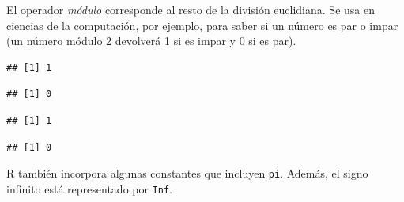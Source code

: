 \documentclass[
]{book}
\newenvironment{Shaded}{\begin{snugshade}}{\end{snugshade}}
\newcommand{\DecValTok}[1]{\textcolor[rgb]{0.00,0.00,0.81}{#1}}
\newcommand{\NormalTok}[1]{#1}
\newcommand{\OperatorTok}[1]{\textcolor[rgb]{0.81,0.36,0.00}{\textbf{#1}}}
\newcommand{\StringTok}[1]{\textcolor[rgb]{0.31,0.60,0.02}{#1}}
\begin{document}
El operador \emph{módulo} corresponde al resto de la división euclidiana. Se usa en ciencias de la computación, por ejemplo, para saber si un número es par o impar (un número módulo 2 devolverá 1 si es impar y 0 si es par).

\begin{Shaded}
\end{Shaded}

\begin{verbatim}
## [1] 1
\end{verbatim}

\begin{Shaded}
\end{Shaded}

\begin{verbatim}
## [1] 0
\end{verbatim}

\begin{Shaded}
\end{Shaded}

\begin{verbatim}
## [1] 1
\end{verbatim}

\begin{Shaded}
\end{Shaded}

\begin{verbatim}
## [1] 0
\end{verbatim}

R también incorpora algunas constantes que incluyen \texttt{pi}. Además, el signo infinito está representado por \texttt{Inf}.
\end{document}
